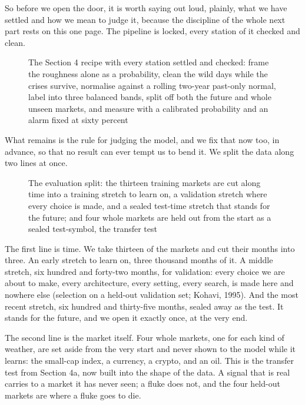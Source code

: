 \documentclass[11pt]{article} %
\begin{document}
So before we open the door, it is worth saying out loud, plainly, what we have settled and how we mean to judge it, because the discipline of the whole next part rests on this one page. The pipeline is locked, every station of it checked and clean.

\begin{figure}[htbp]
\centering

\caption{The Section 4 recipe with every station settled and checked: frame the roughness alone as a probability, clean the wild days while the crises survive, normalise against a rolling two-year past-only normal, label into three balanced bands, split off both the future and whole unseen markets, and measure with a calibrated probability and an alarm fixed at sixty percent}
\end{figure}


What remains is the rule for judging the model, and we fix that now too, in advance, so that no result can ever tempt us to bend it. We split the data along two lines at once.

\begin{figure}[htbp]
\centering

\caption{The evaluation split: the thirteen training markets are cut along time into a training stretch to learn on, a validation stretch where every choice is made, and a sealed test-time stretch that stands for the future; and four whole markets are held out from the start as a sealed test-symbol, the transfer test}
\end{figure}


The first line is time. We take thirteen of the markets and cut their months into three. An early stretch to learn on, three thousand months of it. A middle stretch, six hundred and forty-two months, for validation: every choice we are about to make, every architecture, every setting, every search, is made here and nowhere else (selection on a held-out validation set; Kohavi, 1995). And the most recent stretch, six hundred and thirty-five months, sealed away as the test. It stands for the future, and we open it exactly once, at the very end.

The second line is the market itself. Four whole markets, one for each kind of weather, are set aside from the very start and never shown to the model while it learns: the small-cap index, a currency, a crypto, and an oil. This is the transfer test from Section 4a, now built into the shape of the data. A signal that is real carries to a market it has never seen; a fluke does not, and the four held-out markets are where a fluke goes to die.
\end{document}
